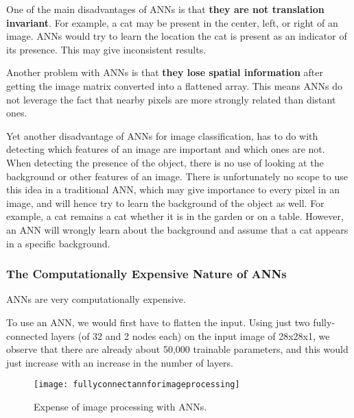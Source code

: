 	\begin{bulletedlist}
		\item One of the main disadvantages of ANNs is that \textbf{they are not translation invariant}.  For example, a cat may be present in the center, left, or right of an image.  ANNs would try to learn the location the cat is present as an indicator of its presence.  This may give inconsistent results.
		\item Another problem with ANNs is that \textbf{they lose spatial information} after getting the image matrix converted into a flattened array.  This means ANNs do not leverage the fact that nearby pixels are more strongly related than distant ones.
		\item Yet another disadvantage of ANNs for image classification, has to do with detecting which features of an image are important and which ones are not. When detecting the presence of the object, there is no use of looking at the background or other features of an image. There is unfortunately no scope to use this idea in a traditional ANN, which may give importance to every pixel in an
image, and will hence try to learn the background of the object as well.  For example, a cat remains a cat whether it is in the garden or on a table.  However, an ANN will wrongly learn about the background and assume that a cat appears in a specific background.
	\end{bulletedlist}


	\subsubsection{The Computationally Expensive Nature of ANNs}
	\begin{bulletedlist}
		\item ANNs are very computationally expensive.
		\item To use an ANN, we would first have to flatten the input. Using just two fully-connected layers (of 32 and 2 nodes each) on the input image of 28x28x1, we observe that there are already about 50,000 trainable parameters, and this would just increase with an increase in the number of layers.
	\end{bulletedlist}

	\begin{figure}[tbh]
		\centering
		\texttt{[image: fullyconnectannforimageprocessing]}
		\caption[Expense of image processing with ANNs]{Expense of image processing with ANNs.}
		\label{fig:fullyconnectannforimageprocessing}
	\end{figure}


